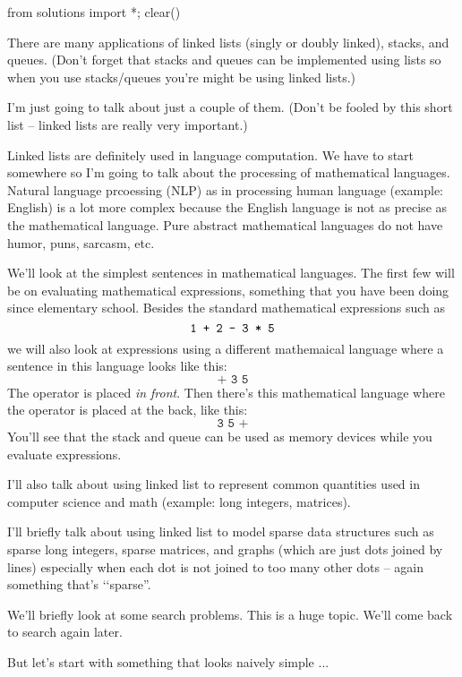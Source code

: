 \begin{python0}
from solutions import *; clear()
\end{python0}

There are many applications of linked lists (singly or doubly linked), stacks, and
queues.
(Don't forget that stacks and queues can be implemented using lists so when
you use stacks/queues
you're might be using linked lists.)

I'm just going to talk about just a couple of them.
(Don't be fooled by this short list -- linked lists are really very
important.)

Linked lists are definitely used in language computation.
We have to start somewhere so I'm going to talk about
the processing of mathematical languages.
Natural language prcoessing (NLP) as in processing human language
(example: English) is a lot more complex because the English
language is not as precise as the mathematical language.
Pure abstract mathematical languages do not have humor, puns,
sarcasm, etc.

We'll look at the simplest sentences in mathematical languages.
The first few will be on evaluating mathematical expressions,
something that you
have been doing since elementary school.
Besides the standard mathematical expressions such as
\[
\text{\texttt{1 + 2 - 3 * 5}} 
\]
we will also look at expressions using a different mathemaical language where a
sentence in this language looks like this:
\[
\texttt{+ 3 5}
\]
The operator is placed \textit{in front}.
Then there's this mathematical language where the operator is placed at the back,
like this:
\[
\texttt{3 5 +}
\]
You'll see that the stack and queue can be used as memory devices while you
evaluate expressions.

I'll also talk about using linked list to represent
common quantities used in computer science and math (example:
long integers, matrices).

I'll briefly talk about using linked list to model sparse data structures
such as sparse long integers, sparse matrices, and
graphs (which are just dots joined by lines) especially when
each dot is not joined to too many other dots -- again something
that's \lq\lq sparse''.

We'll briefly look at some search problems.
This is a huge topic. We'll come back to search again later.

But let's start with something that looks naively simple ...
